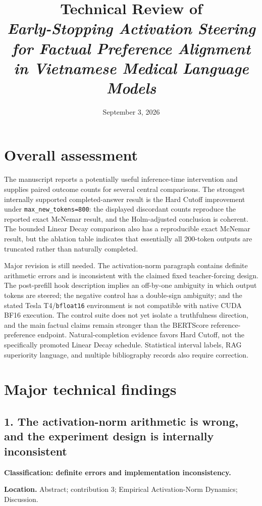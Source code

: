 \documentclass[11pt]{article}
\title{Technical Review of\\
\emph{Early-Stopping Activation Steering for Factual Preference Alignment in Vietnamese Medical Language Models}}
\author{}
\date{September 3, 2026}
\begin{document}
\maketitle

\section*{Overall assessment}

The manuscript reports a potentially useful inference-time intervention and supplies paired outcome counts for several central comparisons.  The strongest internally supported completed-answer result is the Hard Cutoff improvement under \texttt{max\_new\_tokens=800}: the displayed discordant counts reproduce the reported exact McNemar result, and the Holm-adjusted conclusion is coherent.  The bounded Linear Decay comparison also has a reproducible exact McNemar result, but the ablation table indicates that essentially all 200-token outputs are truncated rather than naturally completed.

Major revision is still needed.  The activation-norm paragraph contains definite arithmetic errors and is inconsistent with the claimed fixed teacher-forcing design.  The post-prefill hook description implies an off-by-one ambiguity in which output tokens are steered; the negative control has a double-sign ambiguity; and the stated Tesla T4/\texttt{bfloat16} environment is not compatible with native CUDA BF16 execution.  The control suite does not yet isolate a truthfulness direction, and the main factual claims remain stronger than the BERTScore reference-preference endpoint.  Natural-completion evidence favors Hard Cutoff, not the specifically promoted Linear Decay schedule.  Statistical interval labels, RAG superiority language, and multiple bibliography records also require correction.

\section*{Major technical findings}

\subsection*{1. The activation-norm arithmetic is wrong, and the experiment design is internally inconsistent}

\textbf{Classification: definite errors and implementation inconsistency.}

\textbf{Location.} Abstract; contribution 3; Empirical Activation-Norm Dynamics; Discussion.
\end{document}
